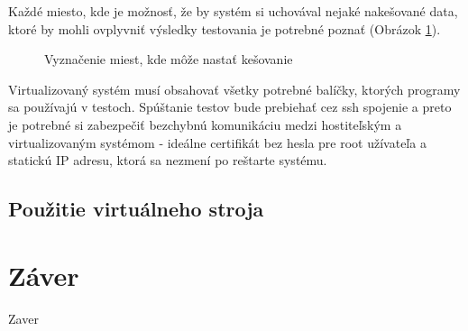 Každé miesto, kde je možnosť, že by systém si uchovával nejaké nakešované data,
ktoré by mohli ovplyvniť výsledky testovania je potrebné poznať (Obrázok \ref{graf-cache}).

\begin{figure}[ht]
\begin{center}
  \caption{Vyznačenie miest, kde môže nastať kešovanie}
  \label{graf-cache}
\end{center}
\end{figure}

Virtualizovaný systém musí obsahovať všetky potrebné balíčky, ktorých programy
sa používajú v testoch. Spúštanie testov bude prebiehať cez ssh spojenie a
preto je potrebné si zabezpečiť bezchybnú komunikáciu medzi hostiteľským a
virtualizovaným systémom - ideálne certifikát bez hesla pre root užívateľa a
statickú IP adresu, ktorá sa nezmení po reštarte systému.

\section{Použitie virtuálneho stroja}

\chapter{Záver}
Zaver

